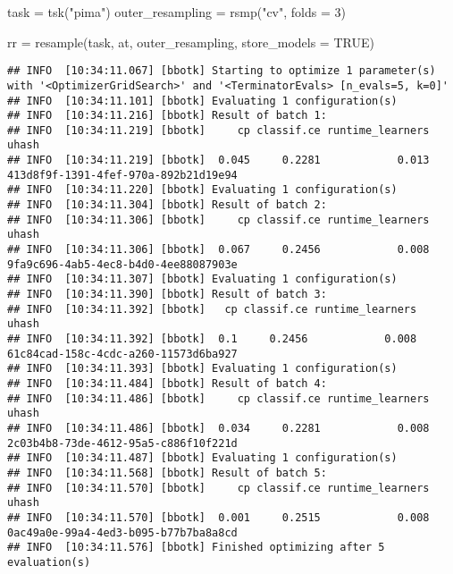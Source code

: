 \documentclass[
]{scrbook}
\newenvironment{Shaded}{\begin{snugshade}}{\end{snugshade}}
\newcommand{\AttributeTok}[1]{\textcolor[rgb]{0.77,0.63,0.00}{#1}}
\newcommand{\ConstantTok}[1]{\textcolor[rgb]{0.00,0.00,0.00}{#1}}
\newcommand{\DecValTok}[1]{\textcolor[rgb]{0.00,0.00,0.81}{#1}}
\newcommand{\FunctionTok}[1]{\textcolor[rgb]{0.00,0.00,0.00}{#1}}
\newcommand{\NormalTok}[1]{#1}
\newcommand{\OtherTok}[1]{\textcolor[rgb]{0.56,0.35,0.01}{#1}}
\newcommand{\StringTok}[1]{\textcolor[rgb]{0.31,0.60,0.02}{#1}}
\renewenvironment{Shaded} {\begin{snugshade}\small} {\end{snugshade}}
\begin{document}
\begin{Shaded}
\begin{Highlighting}[]
\NormalTok{task }\OtherTok{=} \FunctionTok{tsk}\NormalTok{(}\StringTok{"pima"}\NormalTok{)}
\NormalTok{outer\_resampling }\OtherTok{=} \FunctionTok{rsmp}\NormalTok{(}\StringTok{"cv"}\NormalTok{, }\AttributeTok{folds =} \DecValTok{3}\NormalTok{)}

\NormalTok{rr }\OtherTok{=} \FunctionTok{resample}\NormalTok{(task, at, outer\_resampling, }\AttributeTok{store\_models =} \ConstantTok{TRUE}\NormalTok{)}
\end{Highlighting}
\end{Shaded}

\begin{verbatim}
## INFO  [10:34:11.067] [bbotk] Starting to optimize 1 parameter(s) with '<OptimizerGridSearch>' and '<TerminatorEvals> [n_evals=5, k=0]' 
## INFO  [10:34:11.101] [bbotk] Evaluating 1 configuration(s) 
## INFO  [10:34:11.216] [bbotk] Result of batch 1: 
## INFO  [10:34:11.219] [bbotk]     cp classif.ce runtime_learners                                uhash 
## INFO  [10:34:11.219] [bbotk]  0.045     0.2281            0.013 413d8f9f-1391-4fef-970a-892b21d19e94 
## INFO  [10:34:11.220] [bbotk] Evaluating 1 configuration(s) 
## INFO  [10:34:11.304] [bbotk] Result of batch 2: 
## INFO  [10:34:11.306] [bbotk]     cp classif.ce runtime_learners                                uhash 
## INFO  [10:34:11.306] [bbotk]  0.067     0.2456            0.008 9fa9c696-4ab5-4ec8-b4d0-4ee88087903e 
## INFO  [10:34:11.307] [bbotk] Evaluating 1 configuration(s) 
## INFO  [10:34:11.390] [bbotk] Result of batch 3: 
## INFO  [10:34:11.392] [bbotk]   cp classif.ce runtime_learners                                uhash 
## INFO  [10:34:11.392] [bbotk]  0.1     0.2456            0.008 61c84cad-158c-4cdc-a260-11573d6ba927 
## INFO  [10:34:11.393] [bbotk] Evaluating 1 configuration(s) 
## INFO  [10:34:11.484] [bbotk] Result of batch 4: 
## INFO  [10:34:11.486] [bbotk]     cp classif.ce runtime_learners                                uhash 
## INFO  [10:34:11.486] [bbotk]  0.034     0.2281            0.008 2c03b4b8-73de-4612-95a5-c886f10f221d 
## INFO  [10:34:11.487] [bbotk] Evaluating 1 configuration(s) 
## INFO  [10:34:11.568] [bbotk] Result of batch 5: 
## INFO  [10:34:11.570] [bbotk]     cp classif.ce runtime_learners                                uhash 
## INFO  [10:34:11.570] [bbotk]  0.001     0.2515            0.008 0ac49a0e-99a4-4ed3-b095-b77b7ba8a8cd 
## INFO  [10:34:11.576] [bbotk] Finished optimizing after 5 evaluation(s) 

\end{verbatim}
\end{document}
